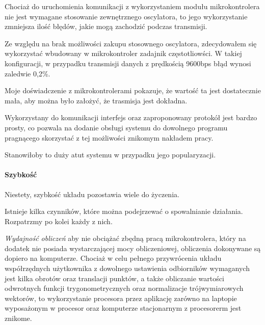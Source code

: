 Chociaż do uruchomienia komunikacji z wykorzystaniem modułu  mikrokontrolera nie jest wymagane stosowanie zewnętrznego oscylatora, to jego wykorzystanie zmniejsza ilość błędów, jakie mogą zachodzić podczas transmisji.

Ze względu na brak możliwości zakupu stosownego oscylatora, zdecydowałem się wykorzystać wbudowany w mikrokontroler zadajnik częstotliowści. W takiej konfiguracji, w przypadku transmisji danych z prędkością 9600bps błąd wynosi zaledwie 0,2\%.\label{sec:usart_error}

Moje doświadczenie z mikrokontrolerami pokazuje, że wartość ta jest dostatecznie mała, aby można było założyć, że trasmisja jest dokładna.

Wykorzystany do komunikacji interfejs oraz zaproponowany protokół jest bardzo prosty, co pozwala na dodanie obsługi systemu do dowolnego programu pragnącego skorzystać z tej możliwości znikomym nakładem pracy.

Stanowiłoby to duży atut systemu w przypadku jego popularyzacji.

\paragraph{Szybkość}
Niestety, szybkość układu pozostawia wiele do życzenia.

Istnieje kilka czynników, które można podejrzewać o spowalnianie działania. Rozpatrzmy po kolei każdy z nich.

\textsl{Wydajność obliczeń} \ppauza aby nie obciążać zbędną pracą mikrokontrolera, który na dodatek nie posiada wystarczającej mocy obliczeniowej, obliczenia dokonywane są dopiero na komputerze. Chociaż w celu pełnego przywrócenia układu współrzędnych użytkownika z dowolnego ustawienia odbiorników wymaganych jest kilka obrotów oraz translacji punktów, a także obliczanie wartości odwrotnych funkcji trygonometrycznych oraz normalizacje trójwymiarowych wektorów, to wykorzystanie procesora przez aplikację zarówno na laptopie wyposażonym w procesor  oraz komputerze stacjonarnym z procesorerm  jest znikome.

